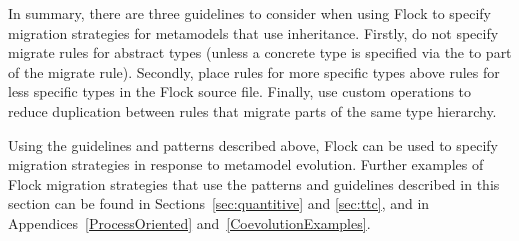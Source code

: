 In summary, there are three guidelines to consider when using Flock to specify migration strategies for metamodels that use inheritance. Firstly, do not specify migrate rules for abstract types (unless a concrete type is specified via the to part of the migrate rule). Secondly, place rules for more specific types above rules for less specific types in the Flock source file. Finally, use custom operations to reduce duplication between rules that migrate parts of the same type hierarchy.

Using the guidelines and patterns described above, Flock can be used to specify migration strategies in response to metamodel evolution. Further examples of Flock migration strategies that use the patterns and guidelines described in this section can be found in Sections~\ref{sec:quantitive} and \ref{sec:ttc}, and in Appendices~\ref{ProcessOriented} and~\ref{CoevolutionExamples}.

 
